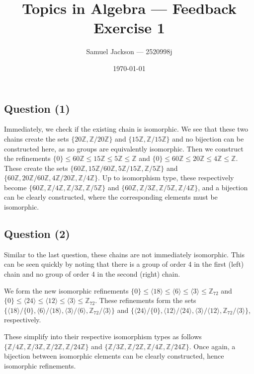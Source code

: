\documentclass{article}
\title{Topics in Algebra  --- Feedback Exercise 1}
\author{Samuel Jackson --- 2520998j}
\date{\today}
\begin{document}
\maketitle

\newcommand{\zmod}[1]{\mathbb{Z}/#1\mathbb{Z}}
\newcommand{\zmodtwo}[2]{#1\mathbb{Z}/#2\mathbb{Z}}
\newcommand{\Z}{\mathbb{Z}}
\newcommand{\anglemod}[2]{\langle#1\rangle / \langle#2\rangle}

\begin{center}
\section*{Question (1)}
\end{center}

\begin{flushleft}
Immediately, we check if the existing chain is isomorphic. We see that these two chains create the sets $\Big\{20\mathbb{Z}, \zmod{20}\Big\}$ and $\Big\{15\mathbb{Z}, \zmod{15}\Big\}$ and no bijection can be constructed here, as no groups are equivalently isomorphic. Then we construct the refinements $\{0\} \leq 60\Z \leq 15\Z \leq 5\Z \leq \Z$ and $\{0\} \leq 60\Z \leq 20\Z \leq 4\Z \leq \Z$. These create the sets $\Big\{60\Z, \zmodtwo{15}{60}, \zmodtwo{5}{15}, \zmod{5}\Big\}$ and $\Big\{60\Z, \zmodtwo{20}{60}, \zmodtwo{4}{20}, \zmod{4}\Big\}$. Up to isomorphism type, these respectively become $\Big\{60\Z, \zmod{4}, \zmod{3}, \zmod{5}\Big\}$ and $\Big\{60\Z, \zmod{3}, \zmod{5}, \zmod{4}\Big\}$, and a bijection can be clearly constructed, where the corresponding elements must be isomorphic.
\end{flushleft}
\begin{center}
\section*{Question (2)}
\end{center}

\begin{flushleft}
Similar to the last question, these chains are not immediately isomorphic. This can be seen quickly by noting that there is a group of order 4 in the first (left) chain and no group of order 4 in the second (right) chain. \newline

We form the new isomorphic refinements $\{0\} \leq \langle18\rangle \leq \langle6\rangle \leq \langle3\rangle \leq \Z_{72}$ and $\{0\} \leq \langle24\rangle \leq \langle12\rangle \leq \langle3\rangle \leq \Z_{72}$. These refinements form the sets $\{\langle18\rangle/\{0\}, \anglemod{6}{18}, \anglemod{3}{6}, \Z_{72}/\langle3\rangle \}$ and $\{ \langle24\rangle / \{0\}, \anglemod{12}{24}, \anglemod{3}{12}, \Z_{72}/\langle3\rangle \}$, respectively. \newline

These simplify into their respective isomorphism types as follows $\{ \zmod{4}, \zmod{3}, \zmod{2}, \zmod{24}\}$ and $\{ \zmod{3}, \zmod{2}, \zmod{4}, \zmod{24}\}$. Once again, a bijection between isomorphic elements can be clearly constructed, hence isomorphic refinements.
\end{flushleft}
\end{document}
